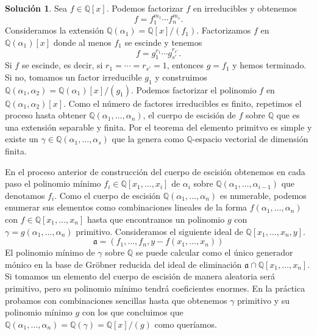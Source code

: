 \documentclass[10pt]{article}
\theoremstyle{definition}
\newtheorem*{sol}{Solución}
\newcommand{\QQ}{\mathbb{Q}}
\begin{document}
\begin{sol} Sea $f\in\mathbb{Q}[x]$. Podemos factorizar $f$ en irreducibles y obtenemos 
\[f = f_1^{m_1}\cdots f_n^{m_s}.\]
Consideramos la extensión $\QQ(\alpha_1) = \QQ[x]/(f_1)$. Factorizamos $f$ en $\QQ(\alpha_1)[x]$ donde al menos $f_1$ se escinde y tenemos
\[f = g_1^{r_1}\cdots g_{s'}^{r_{s'}}.\] Si $f$ se escinde, es decir, si $r_1=\cdots = r_{s'} = 1$, entonces $g=f_1$ y hemos terminado. Si no, tomamos un factor irreducible $g_1$ y construimos $\QQ(\alpha_1,\alpha_2) = \QQ(\alpha_1)[x]/(g_1)$. Podemos factorizar el polinomio $f$ en $\QQ(\alpha_1,\alpha_2)[x]$. Como el número de factores irreducibles es finito, repetimos el proceso hasta obtener $\QQ(\alpha_1,\ldots, \alpha_n)$, el cuerpo de escisión de $f$ sobre $\QQ$ que es una extensión separable y finita. Por el teorema del elemento primitvo es simple y existe un $\gamma\in\QQ(\alpha_1,\ldots,\alpha_s)$ que la genera como $\QQ$-espacio vectorial de dimensión finita.

En el proceso anterior de construcción del cuerpo de escisión obtenemos en cada paso el polinomio mínimo $f_i\in\QQ[x_1,\ldots, x_i]$ de $\alpha_i$ sobre $\QQ(\alpha_1,\ldots,\alpha_{i-1})$ que denotamos $f_i$. Como el cuerpo de escisión $\QQ(\alpha_1,\ldots,\alpha_n)$ es numerable, podemos enumerar sus elementos como combinaciones lineales de la forma $f(\alpha_1,\ldots,\alpha_n)$ con $f\in\QQ[x_1,\ldots, x_n]$ hasta que encontramos un polinomio $g$ con $\gamma=g(\alpha_1,\ldots,\alpha_n)$ primitivo. Consideramos el siguiente ideal de $\QQ\left[x_1,\ldots,x_n,y\right]$.
\[\mathfrak{a} = \left(f_1,\ldots, f_n, y-f(x_1,\ldots, x_n)\right)\]
El polinomio mínimo de $\gamma$ sobre $\QQ$ se puede calcular como el único generador mónico en la base de Gröbner reducida del ideal de eliminación $\mathfrak{a}\cap\QQ[x_1,\ldots,x_n]$. Si tomamos un elemento del cuerpo de escisión de manera aleatoria será primitivo, pero su polinomio mínimo tendrá coeficientes enormes. En la práctica probamos con combinaciones sencillas hasta que obtenemos $\gamma$ primitivo y su polinomio mínimo $g$ con los que concluimos que $\QQ(\alpha_1,\ldots,\alpha_n)=\QQ(\gamma)=\QQ[x]/(g)$ como queríamos.


\end{sol}
\end{document}
